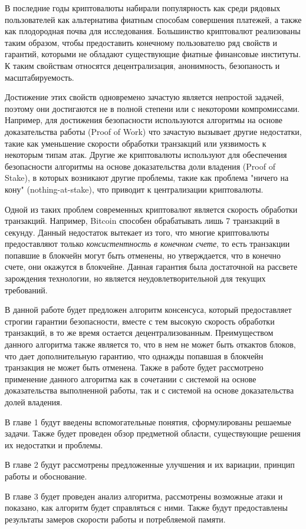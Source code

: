 \startprefacepage
В последние годы криптовалюты набирали популярность как среди рядовых пользователей как альтернатива фиатным способам совершения платежей, а также как плодородная почва для исследования.
Большинство криптовалют реализованы таким образом, чтобы предоставить конечному пользователю ряд свойств и гарантий, которыми не обладают существующие фиатные финансовые институты. К таким свойствам относятся децентрализация, анонимность, безопаность и масштабируемость.
 
Достижение этих свойств одновремено зачастую является непростой задачей, 
поэтому они достигаются не в полной степени или с некотороми компромиссами.
Например, для достижения безопасности используются алгоритмы на основе доказательства работы (Proof of Work)\cite{pow}
что зачастую вызывает другие недостатки, такие как уменьшение скорости обработки транзакций или уязвимость к некоторым типам атак.
Другие же криптовалюты используют для обеспечения безопасности алгоритмы на основе доказательства доли владения (Proof of Stake)\cite{pos}, в которых 
возникают другие проблемы, такие как проблема "ничего на кону" (nothing-at-stake)\cite{pos},
что приводит к централизации криптовалюты.

Одной из таких проблем современных криптовалют является скорость обработки транзакций. 
Например, Bitcoin способен обрабатывать лишь 7 транзакций в секунду. Данный недостаток вытекает из того,
что многие криптовалюты предоставляют только \textit{консистентность в конечном счете}\cite{DBLP:journals/corr/DeckerSW14}, то есть транзакции попавшие в блокчейн могут быть отменены, но утверждается, что в конечно счете, они окажутся в блокчейне. Данная гарантия была достаточной на рассвете зарождения технологии,  но является неудовлетворительной для текущих требований.

В данной работе будет предложен алгоритм консенсуса, который предоставляет строгии гарантии безопасности, 
вместе с тем высокую скорость обработки транзакций, в то же время остается децентрализованным.
Преимуществом данного алгоритма также является то, что в нем не может быть откактов блоков,
что дает дополнительную гарантию, что однажды попавшая в блокчейн транзакция не может быть отменена.
Также в работе будет рассмотрено применение данного алгоритма как в сочетании с системой на основе доказательства выполненной работы,
так и с системой на основе доказательства долей владения.

В главе 1 будут введены вспомогательные понятия, сформулированы решаемые задачи.
Также будет проведен обзор предметной области, существующие решения их недостатки и проблемы.

В главе 2 будут рассмотрены предложенные улучшения и их вариации, принцип работы и обоснование.

В главе 3 будет проведен анализ алгоритма, рассмотрены возможные атаки и показано, как алгоритм будет справляться с ними.
Также будут предоставлены результаты замеров скорости работы и потребляемой памяти.